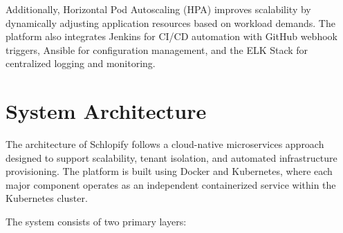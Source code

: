 \documentclass[12pt,a4paper]{report}
\begin{document}
Additionally, Horizontal Pod Autoscaling (HPA) improves scalability by dynamically adjusting application resources based on workload demands. The platform also integrates Jenkins for CI/CD automation with GitHub webhook triggers, Ansible for configuration management, and the ELK Stack for centralized logging and monitoring.














\newpage


\chapter{System Architecture}

The architecture of Schlopify follows a cloud-native microservices approach designed to support scalability, tenant isolation, and automated infrastructure provisioning. The platform is built using Docker and Kubernetes, where each major component operates as an independent containerized service within the Kubernetes cluster.

The system consists of two primary layers:
\end{document}
